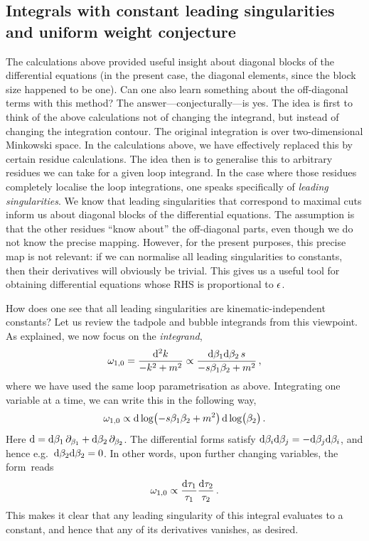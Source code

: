 \subsection{Integrals with constant leading singularities and uniform weight conjecture}

The calculations above provided useful insight about diagonal blocks of the differential equations (in the present case, the diagonal elements, since the block size happened to be one). Can one also learn something about the off-diagonal terms with this method?
The answer---conjecturally---is yes. The idea is first to think of the above calculations not of changing the integrand, but instead of changing the integration contour.
The original integration is over two-dimensional Minkowski space. In the calculations above, we have effectively replaced this by certain residue calculations.
The idea then is to generalise this to arbitrary residues we can take for a given loop integrand.
In the case where those residues completely localise the loop integrations, one speaks specifically of \emph{leading singularities}. 
We know that leading singularities that correspond to maximal cuts inform us about diagonal blocks of the differential equations. 
The assumption is that the other residues ``know about'' the off-diagonal parts, even though we do not know the precise mapping.
However, for the present purposes, this precise map is not relevant: if we can normalise all leading singularities 
to constants, then their derivatives will obviously be trivial. 
This gives us a useful tool for obtaining differential equations whose RHS is proportional to $\epsilon$.

How does one see that all leading singularities are kinematic-independent constants?
Let us review the tadpole and bubble integrands from this viewpoint.
As explained, we now focus on the {\it integrand},
\begin{align}
    \omega_{1,0} = \frac{\mathrm{d}^2k}{-k^2+m^2} \propto \frac{\mathrm{d}\beta_1 \mathrm{d}\beta_2 \, s}{-s \beta_1 \beta_2 + m^2} \,,
\end{align}
where we have used the same loop parametrisation as above.
Integrating one variable at a time, we can write this in the following way,
\begin{align}
\omega_{1,0} \propto \mathrm{d} \log \bigl(-s \beta_1 \beta_2 + m^2 \bigr) \, \mathrm{d}\log \bigl(\beta_2 \bigr) \,.
\end{align}
Here $\mathrm{d}= \mathrm{d}\beta_1 \, \partial_{\beta_1} + \mathrm{d}\beta_2 \, \partial_{\beta_2}$. The differential forms satisfy $\mathrm{d}\beta_i \mathrm{d}\beta_j = - \mathrm{d}\beta_j \mathrm{d}\beta_i$, 
and hence e.g.~$\mathrm{d}\beta_2 \mathrm{d}\beta_2 =0$.
In other words, upon further changing variables, the form~reads
\begin{align} \label{eq:omega10dlog}
\omega_{1,0} \propto \frac{\mathrm{d}\tau_1}{\tau_1} \frac{\mathrm{d}\tau_2}{\tau_2} \,.
\end{align}
This makes it clear that any leading singularity of this integral evaluates to a constant, and hence that any of its derivatives vanishes, as desired.

